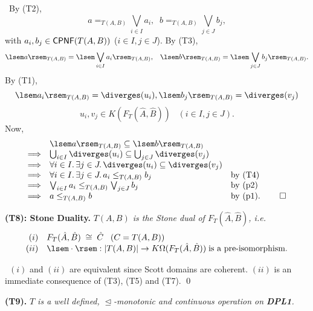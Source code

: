 \proof\ By (T2),
\[ a =_{T(A,B)} \bigvee_{i \in I}a_{i}, \;\; b=_{T(A,B)} \bigvee_{j \in J}b_{j}, \]
with $a_{i}, b_{j} \in {\sf CPNF}(T(A,B))$ ($i \in I, j \in J$). By (T3),
\[ \lsem a \rsem_{T(A,B)} = \lsem \bigvee_{i \in I}a_{i} \rsem_{T(A,B)}, \;\;\; \lsem b \rsem_{T(A,B)} = \lsem \bigvee_{j \in J}b_{j} \rsem_{T(A,B)}. \]
By (T1),
\[ \lsem a_{i} \rsem_{T(A,B)}  =   \diverges (u_{i}),  
\lsem b_{j} 
\rsem_{T(A,B)} =  
\diverges (v_{j}) \]
\[ u_{i}, v_{j} \in K(F_{T}(\hat{A},\hat{B})) \;\;\; (i \in I, j \in J). \] 
Now,
\[\begin{array}{lll}
            & \lsem a \rsem_{T(A,B)} \subseteq \lsem b \rsem_{T(A,B)}   & \\
\Longrightarrow & \bigcup_{i \in I}\diverges (u_{i}) \subseteq \bigcup_{j \in J} \diverges (v_{j})  & \\
\Longrightarrow & \forall i \in I. \, \exists j \in J. \, \diverges (u_{i}) \subseteq \diverges (v_{j}) & \\
\Longrightarrow & \forall i \in I. \, \exists j \in J. \, a_{i} \leq_{T(A,B)} b_{j} &  \mbox{by (T4)} \\
\Longrightarrow & \bigvee_{i \in I}a_{i} \leq_{T(A,B)} \bigvee_{j \in J}b_{j} & \mbox{by (p2)} \\
\Longrightarrow & a \leq_{T(A,B)} b & \mbox{by (p1).} \; \qed 
\end{array} \]

{\bf (T8): Stone Duality.} {\it $T(A,B)$ is the Stone dual of $F_{T}(\hat{A},
\hat{B})$, i.e.}
\[\begin{array}{rl}
(i)   & F_{T}(\hat{A},\hat{B}) \; \cong \;  \hat{C} \;\;\; (C = T(A,B)) \\
(ii)  & \lsem \cdot \rsem : |T(A,B)| \rightarrow K\Omega (F_{T}(\hat{A},\hat{B})) 
\; \mbox{is a pre-isomorphism.}
\end{array} \]

\proof\ $(i)$ and $(ii)$ are equivalent since Scott domains are coherent.
$(ii)$ is an immediate consequence of (T3), (T5) and (T7). \qed

{\bf (T9).} {\it $T$ is a well defined, $\trianglelefteq$-monotonic and continuous operation on {\bf DPL1}.}

